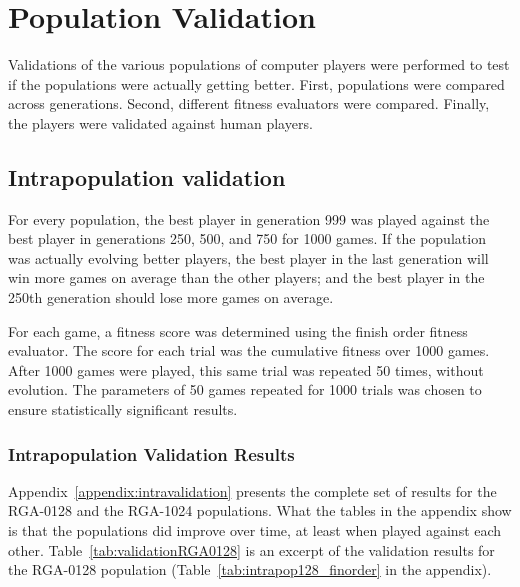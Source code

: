\section{Population Validation} \label{6_Validation}

Validations of the various populations of computer players were performed to
test if the populations were actually getting better. First, populations were
compared across generations. Second, different fitness evaluators were compared.
Finally, the players were validated against human players.

\subsection{Intrapopulation validation}\label{6_intraPopValidation}

For every population, the best player in generation 999 was played against the
best player in generations 250, 500, and 750 for 1000 games. If the population
was actually evolving better players, the best player in the last generation
will win more games on average than the other players; and the best player in
the 250th generation should lose more games on average.

For each game, a fitness score was determined using the finish order fitness
evaluator. The score for each trial was the cumulative fitness over 1000 games.
After 1000 games were played, this same trial was repeated 50 times, without
evolution. The parameters of 50 games repeated for 1000 trials was chosen to
ensure statistically significant results.

\subsubsection{Intrapopulation Validation Results}

Appendix~\ref{appendix:intravalidation} presents the complete set of results for
the RGA-0128 and the RGA-1024 populations. What the tables in the appendix show
is that the populations did improve over time, at least when played against each
other. Table~\ref{tab:validationRGA0128} is an excerpt of the validation results
for the RGA-0128 population (Table~\ref{tab:intrapop128_finorder} in the
appendix).

